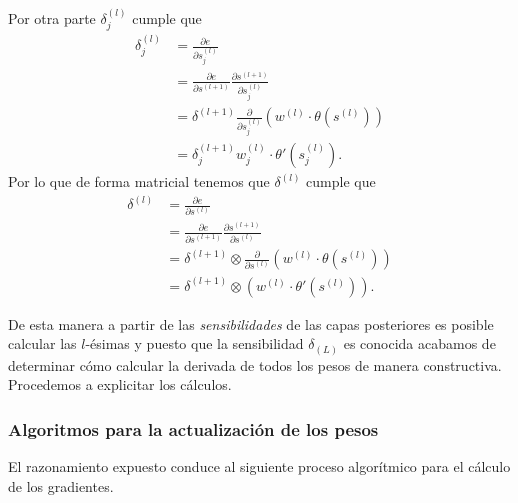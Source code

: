 Por otra parte 
$\delta^{(l)}_j$ 
cumple que 
\begin{align}
    \delta^{(l)}_j 
    &= 
    \frac{\partial e}{\partial s^{(l)}_j}
    \\
    &= 
        \frac{\partial e}{\partial s^{(l+1)}}
        \frac{\partial s^{(l+1)}}{\partial s^{(l)}_j}
    \\
    &= 
    \delta^{(l+1)} 
    \frac{\partial}{\partial s^{(l)}_j}
        \left( w^{(l)} \cdot \theta(s^{(l)})\right)
    \\
    &= 
    \delta^{(l+1)}_j 
    w^{(l)}_j \cdot  \theta'(s^{(l)}_j). 
\end{align}
Por lo que de forma matricial tenemos que $\delta^{(l)}$ 
cumple que 
\begin{align}
    \delta^{(l)} 
    &= 
    \frac{\partial e}{\partial s^{(l)}}
    \\
    &= 
        \frac{\partial e}{\partial s^{(l+1)}}
        \frac{\partial s^{(l+1)}}{\partial s^{(l)}}
    \\
    &= 
    \delta^{(l+1)} 
    \otimes 
    \frac{\partial}{\partial s^{(l)}}
        \left( w^{(l)} \cdot \theta(s^{(l)})\right)
    \\
    &= 
    \delta^{(l+1)} 
    \otimes 
    \left(
    w^{(l)} \cdot \theta'(s^{(l)})
    \right). 
\end{align}

De esta manera a partir de las \textit{sensibilidades} de las 
capas posteriores es posible calcular las $l$-ésimas y puesto que 
la sensibilidad $\delta_{(L)}$ es conocida acabamos de determinar 
cómo calcular la derivada de todos los pesos  de manera constructiva. 
Procedemos a explicitar los cálculos. 

\subsubsection{Algoritmos para la actualización de los pesos}  

El razonamiento expuesto conduce al siguiente proceso algorítmico 
para el cálculo de los gradientes. 

